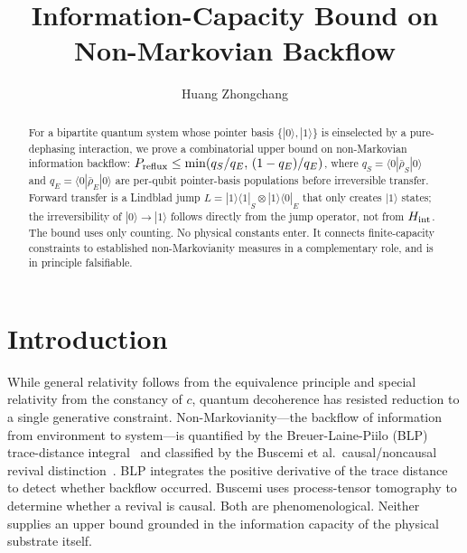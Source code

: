 \documentclass[aps,prl,twocolumn,superscriptaddress,hyperref]{revtex4-2}
\begin{document}
\title{Information-Capacity Bound on Non-Markovian Backflow}

\author{Huang Zhongchang}

\begin{abstract}
For a bipartite quantum system whose pointer basis $\{|0\rangle,|1\rangle\}$ is einselected by a pure-dephasing interaction, we prove a combinatorial upper bound on non-Markovian information backflow: $P_{\rm reflux} \leq \min(q_S/q_E,\,(1-q_E)/q_E)$, where $q_S = \langle 0|\bar{\rho}_S|0\rangle$ and $q_E = \langle 0|\bar{\rho}_E|0\rangle$ are per-qubit pointer-basis populations before irreversible transfer. Forward transfer is a Lindblad jump $L = |1\rangle\langle 1|_S \otimes |1\rangle\langle 0|_E$ that only creates $|1\rangle$ states; the irreversibility of $|0\rangle \to |1\rangle$ follows directly from the jump operator, not from $H_{\rm int}$. The bound uses only counting. No physical constants enter. It connects finite-capacity constraints to established non-Markovianity measures in a complementary role, and is in principle falsifiable.
\end{abstract}

\maketitle

\section{Introduction}

While general relativity follows from the equivalence principle and special relativity from the constancy of $c$, quantum decoherence has resisted reduction to a single generative constraint. Non-Markovianity---the backflow of information from environment to system---is quantified by the Breuer-Laine-Piilo (BLP) trace-distance integral~\cite{Breuer:2009} and classified by the Buscemi et al.\ causal/noncausal revival distinction~\cite{Buscemi:2025}. BLP integrates the positive derivative of the trace distance to detect whether backflow occurred. Buscemi uses process-tensor tomography to determine whether a revival is causal. Both are phenomenological. Neither supplies an upper bound grounded in the information capacity of the physical substrate itself.
\end{document}
